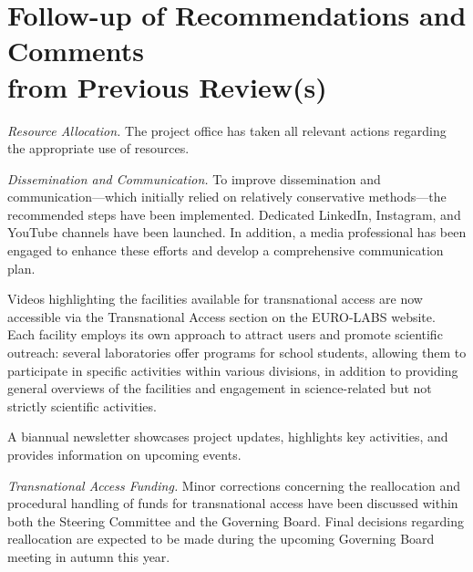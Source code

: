 
\clearpage
\section[Follow-up of Recommendations and Comments from Previous Review(s)]{\texorpdfstring{Follow-up of Recommendations and Comments\\from Previous Review(s)}{Follow-up of Recommendations and Comments from Previous Review(s)}}
\label{sec:follow-up-reviews}



{\it Resource Allocation.}
The project office has taken all relevant actions regarding the appropriate use of resources.

{\it Dissemination and Communication.}
To improve dissemination and communication—which initially relied on relatively conservative methods—the recommended steps have been implemented. Dedicated LinkedIn, Instagram, and YouTube channels have been launched. In addition, a media professional has been engaged to enhance these efforts and develop a comprehensive communication plan.

Videos highlighting the facilities available for transnational access are now accessible via the Transnational Access section on the EURO-LABS website. Each facility employs its own approach to attract users and promote scientific outreach: several laboratories offer programs for school students, allowing them to participate in specific activities within various divisions, in addition to providing general overviews of the facilities and engagement in science-related but not strictly scientific activities.

A biannual newsletter showcases project updates, highlights key activities, and provides information on upcoming events.

{\it Transnational Access Funding.}
Minor corrections concerning the reallocation and procedural handling of funds for transnational access have been discussed within both the Steering Committee and the Governing Board. Final decisions regarding reallocation are expected to be made during the upcoming Governing Board meeting in autumn this year.

